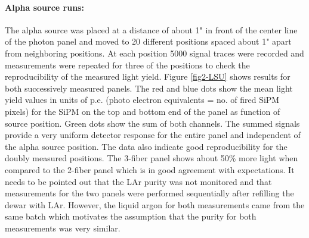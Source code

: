 \paragraph{Alpha source runs:} The alpha source was placed at a distance of about 1" in front of the center line of the photon panel and moved to 20 different positions spaced about 1" apart from neighboring positions. At each position 5000 signal traces were recorded and measurements were repeated for three of the positions to check the reproducibility of the measured light yield. Figure \ref{fig2-LSU} shows results for both successively measured panels. The red and blue dots show the mean light yield values in units of p.e. (photo electron equivalents = no. of fired SiPM pixels) for the SiPM on the top and bottom end of the panel as function of source position. Green dots show the sum of both channels. The summed signals provide a very uniform detector response for the entire panel and independent of the alpha source position. The data also indicate good reproducibility for the doubly measured positions.
The 3-fiber panel shows about 50\% more light when compared to the
2-fiber panel which is in good agreement with expectations. It needs
to be pointed out that the LAr purity was not monitored and that
measurements for the two panels were performed sequentially after
refilling the dewar with LAr. However, the liquid argon for both
measurements came from the same batch which motivates the assumption
that the purity for both measurements was very similar.
%
